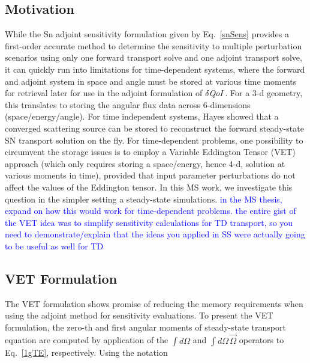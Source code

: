 \documentclass{article}
\newcommand{\vO}{\vec{\Omega}}
\newcommand{\qoi}{{\it QoI}\xspace}
\newcommand{\comment}[2]{\marginpar{\textcolor{#2}{$\star$}}\textcolor{#2}{#1}\newline}
\newcommand{\jcr}[1]{\comment{#1}{blue}}
\newcommand{\jcr}[1]{\phantom{a}}
\begin{document}
\subsection{Motivation} 
While the Sn adjoint sensitivity formulation given by Eq.~\eqref{snSens} provides a first-order accurate method to determine the sensitivity to multiple perturbation scenarios using only one forward transport solve and one adjoint transport solve, it can quickly run into limitations for time-dependent systems, where the forward and adjoint system in space and angle must be stored at various time moments for retrieval later for use in the adjoint formulation of $\delta \qoi$. For a 3-d geometry, this translates to storing the angular
flux data across 6-dimensions (space/energy/angle). For time independent systems, Hayes \cite{Stripling} showed that a converged scattering source can be stored to reconstruct 
the forward steady-state SN transport solution on the fly. For time-dependent problems, one possibility to circumvent the storage issues is to employ a Variable Eddington Tensor (VET) approach (which only requires
storing a space/energy, hence 4-d, solution at various moments in time), provided that input parameter perturbations do not affect the values of the Eddington tensor. In this MS work,
we investigate this question in the simpler setting a steady-state simulations.
\jcr{in the MS thesis, expand on how this would work for time-dependent problems. the entire
gist of the VET idea was to simplify sensitivity calculations for TD transport, so you need
to demonstrate/explain that the ideas you applied in SS were actually going to be useful as well for TD}



\subsection{VET Formulation}

The VET formulation shows promise of reducing the memory requirements when using the adjoint method for sensitivity evaluations. To present the VET formulation, the zero-th and first angular moments of steady-state transport equation are computed by application of the $\int d \Omega$ and $\int d \Omega \, \vO$ operators to Eq.~\eqref{1gTE}, respectively. Using the notation
\end{document}
